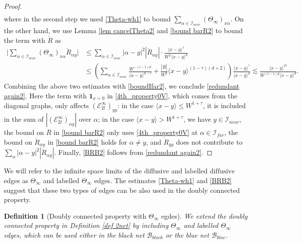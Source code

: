 \documentclass{article}
\newcommand{\1}{\mathds{1}}
\numberwithin{equation}{section}
\newcommand{\al}{\alpha}
\newcommand{\be}{\begin{equation}}
\newcommand{\ee}{\end{equation}}
\renewcommand{\cal}{\mathcal}
\renewcommand{\leq}{\leqslant}
\renewcommand{\le}{\leq}
\newcommand{\dashed}{\text{diffusive}}
\theoremstyle{plain} %
\newtheorem{definition}[theorem]{Definition}
\theoremstyle{remark}
\newcommand{\cob}{\color{purple}}
\newcommand{\nc}{\normalcolor}
\newcommand{\Sele}{{\mathcal E}}
\newcommand{\Seleinf}{{\mathcal E}^{\infty}}
\begin{document}
\begin{proof}
\begin{align*}
\end{align*}
where in the second step we used \eqref{Theta-wh1} to bound $\sum_{\al\in \cal I_{near}}(\Theta_\infty)_{x\al} .$ On the other hand, we use Lemma \ref{lem cancelTheta2} and \eqref{bound barR2} to bound the term with $\mathring R$ as %
\begin{align*}
  \Big|\sum_{\al\in \cal I_{near}}(\Theta_\infty)_{ x \al} \mathring R_{\al y}\Big| & \le \sum_{\al\in \cal I_{near}} |\al-y|^2  |\mathring R_{\al y}| \cdot \frac{\langle x-y\rangle^\tau}{W^2\langle x-y\rangle^{d}} \\
  & \le \left( \sum_{\al\in \cal I_{near}} \frac{W^{-(l-1)d}}{\langle \al-y\rangle^{d-\tau}} +\frac{ |\overline R| }{W^2} \langle x -y\rangle^{(1-\tau)(d+2)}\right) \frac{\langle x-y\rangle^\tau}{ \langle x-y\rangle^{d}} \lesssim \frac{\langle x-y\rangle^{2\tau}}{W^{(l-1)d}\langle x-y\rangle^{d} }.
\end{align*}
Combining the above two estimates with \eqref{boundIfar2}, we conclude \eqref{redundant again2}. Here the term with $\mathbf 1_{x=0}$ in \eqref{4th_property0V}, which comes from the diagonal graphs, only affects $(\Seleinf_{2l})_{yy}$: in the case $\langle x-y\rangle\le W^{1+\tau}$, it is included in the sum of $|(\Seleinf_{2l})_{\al y}|$ over $\al$; in the case $\langle x-y\rangle> W^{1+\tau}$, we have $y\in \cal I_{near}$, the bound on $\overline R$ in \eqref{bound barR2} only uses \eqref{4th_property0V} at $\al\in\cal I_{far}$, the bound on $\mathring R_{\al y}$ in \eqref{bound barR2} holds for $\al\ne y$, and $\mathring R_{yy}$ does not contribute to $\sum_{\al}|\al-y|^2|\mathring R_{\al y}|$. Finally,%
\eqref{BRB2} follows from \eqref{redundant again2}.
 \end{proof}
 
We will refer to the infinite space limits of the $\dashed$ and labelled $\dashed$ edges as $\Theta_\infty$ and labelled $\Theta_\infty$ edges. The estimates \eqref{Theta-wh1} and \eqref{BRB2} suggest that these two types of edges can be also used in the doubly connected property. 
 
 \begin{definition} [Doubly connected property with $\Theta_\infty$ egdes]\label{def 2net infty}  %
We extend the doubly connected property in Definition \ref{def 2net} by including $\Theta_\infty$ and labelled $\Theta_\infty$ edges, 
which can be used either in the black net $\cal B_{black}$ or the blue net $\cal B_{blue}$.
\end{definition}
 
\end{document}

